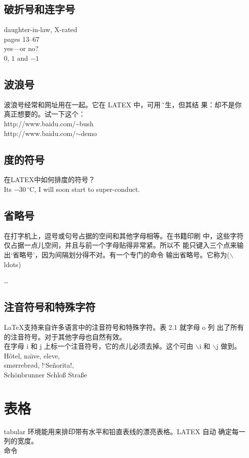 \documentclass{ctexart}
\begin{document}
\subsection{破折号和连字号}
daughter-in-law, X-rated\\
pages 13--67\\
yes---or no? \\
$0$, $1$ and $-1$

\subsection{波浪号}
波浪号经常和网址用在一起。它在 LATEX 中，可用 \~ 产生，但其结
果：却不是你真正想要的。试一下这个：\\
http://www.baidu.com/\~{}bush \\
http://www.baidu.com/$\sim$demo 

\subsection{度的符号}
在LATEX中如何排度的符号？ \\
Its $-30\,^{\circ}\mathrm{C}$,
I will soon start to
super-conduct.

\subsection{省略号}
在打字机上，逗号或句号占据的空间和其他字母相等。在书籍印刷
中，这些字符仅占据一点儿空间，并且与前一个字母贴得非常紧。所以不
能只键入三个点来输出‘省略号’，因为间隔划分得不对。有一个专门的命令
输出省略号。它称为($\backslash$ldots)

\ldots

\subsection{注音符号和特殊字符}
\LaTeX 支持来自许多语言中的注音符号和特殊字符。表 2.1 就字母 o 列
出了所有的注音符号。对于其他字母也自然有效。\\
在字母 i 和 j 上标一个注音符号，它的点儿必须去掉。这个可由 $\backslash$i 和
$\backslash$j 做到。
\\
H\^otel, na\"\i ve, \’el\‘eve,\\
sm\o rrebr\o d, !‘Se\~norita!,\\
Sch\"onbrunner Schlo\ss{}
Stra\ss e

\section{表格}
tabular 环境能用来排印带有水平和铅直表线的漂亮表格。LATEX 自动
确定每一列的宽度。\\
命令\\
\begin{tabular}{|l|}
  \hline
  \hline
\end{tabular}
\end{document}
